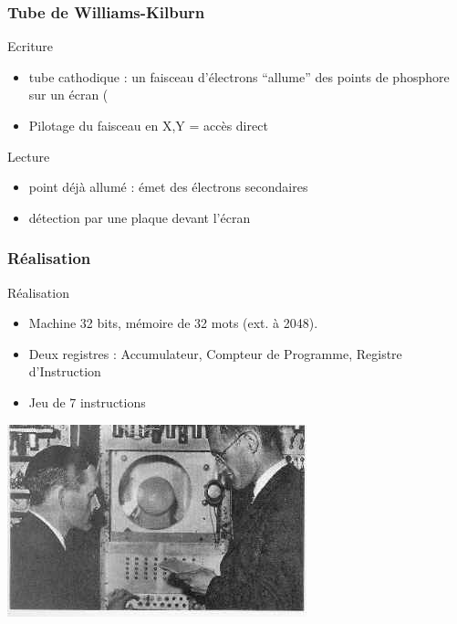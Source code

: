 \documentclass{beamer}
\begin{document}
\begin{frame}
\frametitle{Tube de Williams-Kilburn}

\begin{block}{Ecriture}
\begin{itemize}
\item \alert{tube cathodique} : un faisceau d'électrons ``allume'' des points
de phosphore sur un écran ( 
\item Pilotage du faisceau en X,Y = accès direct
\end{itemize}
\end{block}

\begin{block}{Lecture}
\begin{itemize}
\item \alert{point déjà allumé} : émet des électrons secondaires
\item \alert{détection par une plaque} devant l'écran
\end{itemize}
\end{block}

\end{frame}
\begin{frame}
\frametitle{Réalisation}

\begin{multicols}{2}

\alert{Réalisation}
\begin{itemize}
\item Machine 32 bits, mémoire de 32 mots (ext. à 2048).
\item Deux registres : Accumulateur, Compteur de Programme, Registre d'Instruction
\item Jeu de 7 instructions
\end{itemize}
\includegraphics[width=0.9\linewidth]{Historique/hist409t.jpg}
\end{multicols}

\end{frame}
\end{document}
